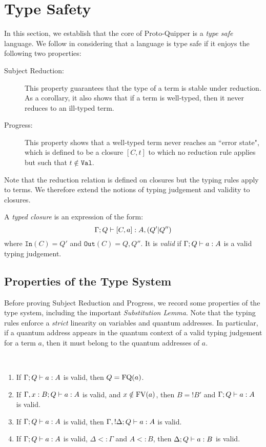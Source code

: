 \documentclass[twoside]{article}
\begin{document}
\section{Type Safety}

In this section, we establish that the core of  Proto-Quipper 
is a \emph{type safe} language. We follow \cite{WrFe94} in 
considering that a language is type safe if it enjoys the 
following two properties: 
\begin{description}
  \item[Subject Reduction:] This property guarantees 
  that the type of a term is stable under reduction.
  As a corollary, it also shows that if a term is 
  well-typed, then it never reduces to an ill-typed 
  term.
  \item[Progress:] This property shows that a 
  well-typed term never reaches an ``error state", 
  which is defined to be a closure $[C,t]$ to which 
  no reduction rule applies but such that 
  $t\notin \mathtt{Val}$. 
\end{description}
Note that the reduction relation is defined on closures 
but the typing rules apply to terms. We therefore extend 
the notions of typing judgement and validity to closures.

\begin{definition}
A \emph{typed closure} is an expression of the form:
\[
\Gamma;Q\vdash [C,a]:A,(Q'|Q'')
\]
where $\mathtt{In}(C)=Q'$ and $\mathtt{Out}(C)=Q,Q''$. 
It is \emph{valid} if $\Gamma;Q\vdash a:A$ is a valid 
typing judgement.
\end{definition}

\subsection{Properties of the Type System}

Before proving Subject Reduction and Progress, we record 
some properties of the type system, including the important 
\emph{Substitution Lemma}. Note that the typing rules 
enforce a \emph{strict} linearity on variables and quantum 
addresses. In particular, if a quantum address appears in 
the quantum context of a valid typing judgement for a term 
$a$, then it must belong to the quantum addresses of $a$.

\begin{lemma}~
\label{prop_type_syst}
\begin{enumerate}
  \item If $\Gamma; Q \vdash a:A$ is valid, 
  then $Q=\mathop{\textrm{FQ}}\nolimits(a)$.\label{q_context}
  \item If $\Gamma,x:B;Q \vdash a:A$ is valid, 
  and $x\notin \mathop{\textrm{FV}}\nolimits(a)$, then $B=!B'$ and 
  $\Gamma;Q \vdash a:A$ is valid.\label{unused_var}
  \item If $\Gamma; Q \vdash a:A$ is valid, 
  then $\Gamma, !\Delta ; Q \vdash a:A$ is valid.\label{weakening}
  \item If $\Gamma ; Q \vdash a:A$ is valid, $\Delta <: \Gamma$
  and $A<:B$, then $\Delta ; Q \vdash a:B$ is valid.\label{subtype}
\end{enumerate}
\end{lemma}
\end{document}

